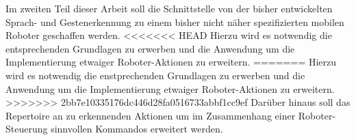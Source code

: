 Im zweiten Teil dieser Arbeit soll die Schnittstelle von der bisher entwickelten Sprach- und Gestenerkennung zu einem bisher nicht n\"aher spezifizierten mobilen Roboter geschaffen werden.
<<<<<<< HEAD
Hierzu wird es notwendig die entsprechenden Grundlagen zu erwerben und die Anwendung um die Implementierung etwaiger Roboter-Aktionen zu erweitern.
=======
Hierzu wird es notwendig die enstprechenden Grundlagen zu erwerben und die Anwendung um die Implementierung etwaiger Roboter-Aktionen zu erweitern.
>>>>>>> 2bb7e10335176dc446d28fa0516733abbf1cc9ef
Dar\"uber hinaus soll das Repertoire an zu erkennenden Aktionen um im Zusammenhang einer Roboter-Steuerung sinnvollen Kommandos erweitert werden.